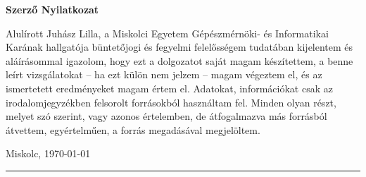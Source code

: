 \documentclass[11pt, a4paper, oneside]{Thesis} %
\begin{document}
\thispagestyle{empty}
{}
\begin{center}{\huge\bf Szerző Nyilatkozat\par}\end{center}


Alulírott Juhász Lilla, a Miskolci Egyetem Gépészmérnöki- és Informatikai Karának hallgatója büntetőjogi és fegyelmi felelősségem tudatában kijelentem és aláírásommal igazolom, hogy ezt a dolgozatot saját magam készítettem, a benne leírt vizsgálatokat – ha ezt külön nem jelzem – magam végeztem el, és az ismertetett eredményeket magam értem el. Adatokat, információkat csak az irodalomjegyzékben felsorolt forrásokból használtam fel. Minden olyan részt, melyet szó szerint, vagy azonos értelemben, de átfogalmazva más forrásból átvettem, egyértelműen, a forrás megadásával megjelöltem.\bigskip

Miskolc, \today \\

\vspace{2cm}
\begin{minipage}{0.4\textwidth}
\begin{center}
\rule{5cm}{0.5mm} \\
\authornames
\end{center}
\end{minipage}

\clearpage %

\tableofcontents
\newpage










\appendix


\end{document}
